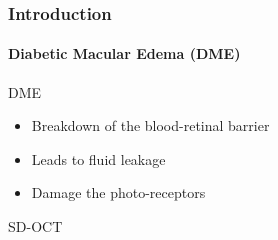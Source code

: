 \documentclass{beamer}
\begin{document}
\begin{frame}
  \frametitle{Introduction}
  \framesubtitle{Diabetic Macular Edema (DME)}
  \begin{block}{DME}
    \begin{itemize}\footnotesize
    \item Breakdown of the blood-retinal barrier
    \item Leads to fluid leakage 
    \item Damage the photo-receptors 
    \end{itemize}
  \end{block}
  \begin{block}{SD-OCT}
    \begin{center}
    \end{center}
  \end{block}
\end{frame}  
\end{document}
